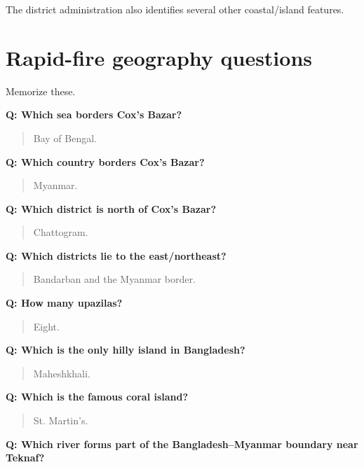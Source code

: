 The district administration also identifies several other coastal/island features.

\medskip

\section{Rapid-fire geography questions}

Memorize these.

\textbf{Q: Which sea borders Cox's Bazar?}

\begin{quote}
Bay of Bengal.\\
\end{quote}

\textbf{Q: Which country borders Cox's Bazar?}

\begin{quote}
Myanmar.\\
\end{quote}

\textbf{Q: Which district is north of Cox's Bazar?}

\begin{quote}
Chattogram.\\
\end{quote}

\textbf{Q: Which districts lie to the east/northeast?}

\begin{quote}
Bandarban and the Myanmar border.\\
\end{quote}

\textbf{Q: How many upazilas?}

\begin{quote}
Eight.\\
\end{quote}

\textbf{Q: Which is the only hilly island in Bangladesh?}

\begin{quote}
Maheshkhali.\\
\end{quote}

\textbf{Q: Which is the famous coral island?}

\begin{quote}
St. Martin's.\\
\end{quote}

\textbf{Q: Which river forms part of the Bangladesh--Myanmar boundary near Teknaf?}

